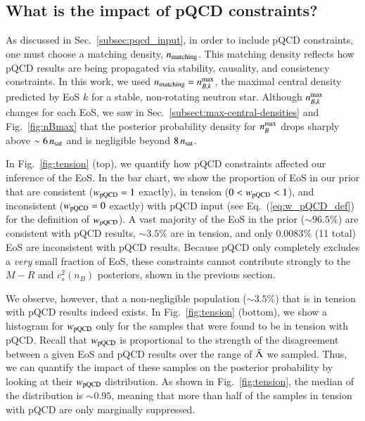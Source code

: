 \documentclass[aps,prd,nofootinbib,tightenlines,notitlepage,floatfix,superscriptaddress,showkeys,twocolumn]{revtex4-1}
\begin{document}
\subsection{What is the impact of pQCD constraints?}\label{subsec:pqcdimpact}

As discussed in Sec.~\ref{subsec:pqcd_input}, in order to include pQCD constraints, one must choose a matching density, $n_{\rm matching}$. This matching density reflects how pQCD results are being propagated via stability, causality, and consistency constraints. In this work, we used $n_{\rm matching} = n_{B,k}^{\rm max}$, the maximal central density predicted by EoS $k$ for a stable, non-rotating neutron star. Although  $n_{B,k}^{\rm max}$ changes for each EoS, we saw in Sec.~\ref{subsect:max-central-densities} and Fig.~\ref{fig:nBmax} that the posterior probability density for $n_{B}^{\rm max}$ drops sharply above $\sim 6 \, n_{\rm sat}$ and is negligible beyond $8 \, n_{\rm sat}$.

In Fig.~\ref{fig:tension} (top), we quantify how pQCD constraints affected our inference of the EoS. In the bar chart, we show the proportion of EoS in our prior that are consistent ($w_{\rm pQCD} = 1$ exactly), in tension ($0<w_{\rm pQCD} < 1$), and inconsistent ($w_{\rm pQCD} = 0$ exactly) with pQCD input (see Eq.~(\ref{eq:w_pQCD_def}) for the definition of $w_{\rm pQCD}$). A vast majority of the EoS in the prior ($\sim96.5\%$) are consistent with pQCD results, $\sim3.5\%$ are in tension, and only $0.0083\%$ (11 total) EoS are inconsistent with pQCD results. Because pQCD only completely excludes a \textit{very} small fraction of EoS, these constraints cannot contribute strongly to the $M-R$ and $c_s^2(n_B)$ posteriors, shown in the previous section. 

We observe, however, that a non-negligible population ($\sim3.5\%$) that is in tension with pQCD results indeed exists. In Fig.~\ref{fig:tension} (bottom), we show a histogram for $w_{\rm pQCD}$ only for the samples that were found to be in tension with pQCD. Recall that $w_{\rm pQCD}$ is proportional to the strength of the disagreement between a given EoS and pQCD results over the range of $\Bar{\Lambda}$ we sampled. Thus, we can quantify the impact of these samples on the posterior probability by looking at their $w_{\rm pQCD}$ distribution. As shown in Fig.~\ref{fig:tension}, the median of the distribution is $\sim 0.95$, meaning that more than half of the samples in tension with pQCD are only marginally suppressed. 
\end{document}
